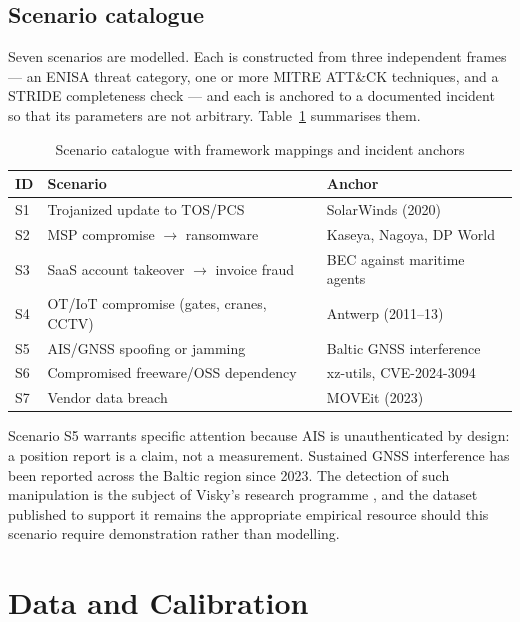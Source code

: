 \documentclass[conference]{IEEEtran}
\begin{document}
\subsection{Scenario catalogue}
\label{sec:scenarios}

Seven scenarios are modelled. Each is constructed from three independent frames ---
an ENISA threat category, one or more MITRE ATT\&CK techniques, and a STRIDE
completeness check --- and each is anchored to a documented incident so that its
parameters are not arbitrary. Table~\ref{tab:scenarios} summarises them.

\begin{table}[t]
\caption{Scenario catalogue with framework mappings and incident anchors}
\label{tab:scenarios}
\centering
\footnotesize
\begin{tabular}{@{}llp{2.5cm}@{}}
\toprule
\textbf{ID} & \textbf{Scenario} & \textbf{Anchor} \\
\midrule
S1 & Trojanized update to TOS/PCS & SolarWinds (2020) \\
S2 & MSP compromise $\rightarrow$ ransomware & Kaseya, Nagoya, DP World \\
S3 & SaaS account takeover $\rightarrow$ invoice fraud & BEC against maritime agents \\
S4 & OT/IoT compromise (gates, cranes, CCTV) & Antwerp (2011--13) \\
S5 & AIS/GNSS spoofing or jamming & Baltic GNSS interference \\
S6 & Compromised freeware/OSS dependency & xz-utils, CVE-2024-3094 \\
S7 & Vendor data breach & MOVEit (2023) \\
\bottomrule
\end{tabular}
\end{table}

Scenario S5 warrants specific attention because AIS is unauthenticated by design: a
position report is a claim, not a measurement. Sustained GNSS interference has been
reported across the Baltic region since 2023. The detection of such manipulation is
the subject of Visky's research programme \cite{benterki2025,viskythesis}, and the
dataset published to support it \cite{viskydataset} remains the appropriate
empirical resource should this scenario require demonstration rather than
modelling.

\section{Data and Calibration}
\end{document}
